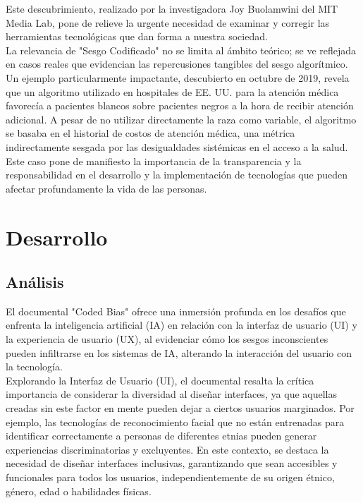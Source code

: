 \documentclass[conference]{IEEEtran}
\begin{document}
Este descubrimiento, realizado por la investigadora Joy Buolamwini del MIT Media Lab, pone de relieve la urgente necesidad de examinar y corregir las herramientas tecnológicas que dan forma a nuestra sociedad.\\

La relevancia de "Sesgo Codificado" no se limita al ámbito teórico; se ve reflejada en casos reales que evidencian las repercusiones tangibles del sesgo algorítmico. Un ejemplo particularmente impactante, descubierto en octubre de 2019, revela que un algoritmo utilizado en hospitales de EE. UU. para la atención médica favorecía a pacientes blancos sobre pacientes negros a la hora de recibir atención adicional. A pesar de no utilizar directamente la raza como variable, el algoritmo se basaba en el historial de costos de atención médica, una métrica indirectamente sesgada por las desigualdades sistémicas en el acceso a la salud. Este caso pone de manifiesto la importancia de la transparencia y la responsabilidad en el desarrollo y la implementación de tecnologías que pueden afectar profundamente la vida de las personas.

\section{Desarrollo}

\subsection{Análisis }


El documental "Coded Bias" ofrece una inmersión profunda en los desafíos que enfrenta la inteligencia artificial (IA) en relación con la interfaz de usuario (UI) y la experiencia de usuario (UX), al evidenciar cómo los sesgos inconscientes pueden infiltrarse en los sistemas de IA, alterando la interacción del usuario con la tecnología.\\

Explorando la Interfaz de Usuario (UI), el documental resalta la crítica importancia de considerar la diversidad al diseñar interfaces, ya que aquellas creadas sin este factor en mente pueden dejar a ciertos usuarios marginados. Por ejemplo, las tecnologías de reconocimiento facial que no están entrenadas para identificar correctamente a personas de diferentes etnias pueden generar experiencias discriminatorias y excluyentes. En este contexto, se destaca la necesidad de diseñar interfaces inclusivas, garantizando que sean accesibles y funcionales para todos los usuarios, independientemente de su origen étnico, género, edad o habilidades físicas.\\
\end{document}
